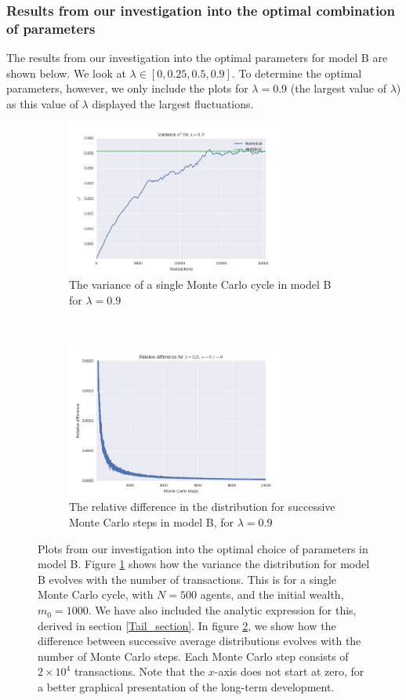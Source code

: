 \documentclass[a4paper, 10pt]{article}
\begin{document}
\subsubsection{Results from our investigation into the optimal combination of parameters}
The results from our investigation into the optimal parameters for model B are shown below. We look at $\lambda \in [0,0.25, 0.5, 0.9]$. To determine the optimal parameters, however, we only include the plots for $\lambda = 0.9$ (the largest value of $\lambda$) as this value of $\lambda$ displayed the largest fluctuations.
\begin{figure}[!ht] %
    \centering
    \begin{subfigure}[H!]{0.5\textwidth}
        \centering
        \includegraphics[height=2.0in]{varLamb09.png} %
        \caption{The variance of a single Monte Carlo cycle in model B for $\lambda = 0.9$}\label{fig:ModelB_Var}
    \end{subfigure}%
    ~ 
    \begin{subfigure}[H!]{0.5\textwidth}
        \centering
        \includegraphics[height=2.0in]{relDiffL09A0G0.png}
        \caption{The relative difference in the distribution for successive Monte Carlo steps in model B, for $\lambda = 0.9$}\label{fig:ModelB_MC_steps}
    \end{subfigure}
    \caption{Plots from our investigation into the optimal choice of parameters in model B. Figure \ref{fig:ModelB_Var} shows how the variance the distribution for model B evolves with the number of transactions. This is for a single Monte Carlo cycle, with $N=500$ agents, and the initial wealth, $m_0=1000$. We have also included the analytic expression for this, derived in section \ref{Tail_section}. In figure \ref{fig:ModelB_MC_steps}, we show how the difference between successive average distributions evolves with the number of Monte Carlo steps. Each Monte Carlo step consists of $2\times 10^4$ transactions. Note that the $x$-axis does not start at zero, for a better graphical presentation of the long-term development.}\label{fig:ModelB}
\end{figure}
\newpage
\end{document}
